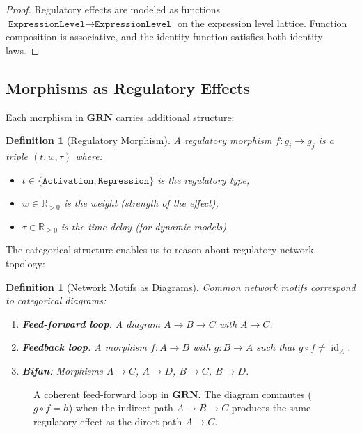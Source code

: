 \documentclass[12pt,a4paper]{article}
\newtheorem{definition}[theorem]{Definition}
\newcommand{\ExprLevel}{\texttt{ExpressionLevel}}
\newcommand{\cat}[1]{\mathbf{#1}}
\newcommand{\id}{\operatorname{id}}
\begin{document}
\begin{proof}
Regulatory effects are modeled as functions $\ExprLevel \to \ExprLevel$ on the expression level lattice.  Function composition is associative, and the identity function satisfies both identity laws.
\end{proof}

\subsection{Morphisms as Regulatory Effects}

Each morphism in $\cat{GRN}$ carries additional structure:

\begin{definition}[Regulatory Morphism]\label{def:reg-morphism}
A regulatory morphism $f : g_i \to g_j$ is a triple $(t, w, \tau)$ where:
\begin{itemize}
  \item $t \in \{\texttt{Activation}, \texttt{Repression}\}$ is the \emph{regulatory type},
  \item $w \in \mathbb{R}_{>0}$ is the \emph{weight} (strength of the effect),
  \item $\tau \in \mathbb{R}_{\geq 0}$ is the \emph{time delay} (for dynamic models).
\end{itemize}
\end{definition}

The categorical structure enables us to reason about regulatory network topology:

\begin{definition}[Network Motifs as Diagrams]\label{def:motifs}
Common network motifs correspond to categorical diagrams:
\begin{enumerate}
  \item \textbf{Feed-forward loop}: A diagram $A \to B \to C$ with $A \to C$.
  \item \textbf{Feedback loop}: A morphism $f : A \to B$ with $g : B \to A$ such that $g \circ f \neq \id_A$.
  \item \textbf{Bifan}: Morphisms $A \to C$, $A \to D$, $B \to C$, $B \to D$.
\end{enumerate}
\end{definition}

\begin{figure}[H]
\centering
{}
\caption{A coherent feed-forward loop in $\cat{GRN}$.  The diagram commutes ($g \circ f = h$) when the indirect path $A \to B \to C$ produces the same regulatory effect as the direct path $A \to C$.}
\label{fig:ffl}
\end{figure}
\end{document}
